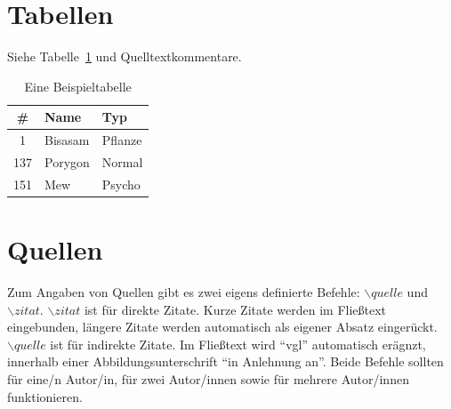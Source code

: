 \documentclass{iwi}
\begin{document}
\section{Tabellen} \label{sec:Tabellen}

Siehe Tabelle~\ref{tbl:pokemon} und Quelltextkommentare.

\begin{table}
\begin{center}
\begin{tabular}{c|ll} %
	\# & Name & Typ	\\
	\hline   
	1      & Bisasam   & Pflanze   \\
	137    & Porygon   & Normal    \\
	151    & Mew       & Psycho    \\

\end{tabular}
\caption{Eine Beispieltabelle}
\label{tbl:pokemon}
\end{center}
\end{table}

\section{Quellen}

Zum Angaben von Quellen gibt es zwei eigens definierte Befehle: $\backslash quelle$ und $\backslash zitat$.
$\backslash zitat$ ist für direkte Zitate. Kurze Zitate werden im Fließtext eingebunden, längere Zitate werden automatisch als eigener Absatz eingerückt.
$\backslash quelle$ ist für indirekte Zitate. 
Im Fließtext wird ``vgl'' automatisch erägnzt, innerhalb einer Abbildungsunterschrift ``in Anlehnung an''. 
Beide Befehle sollten für eine/n Autor/in, für zwei Autor/innen sowie für mehrere Autor/innen funktionieren.
\end{document}
